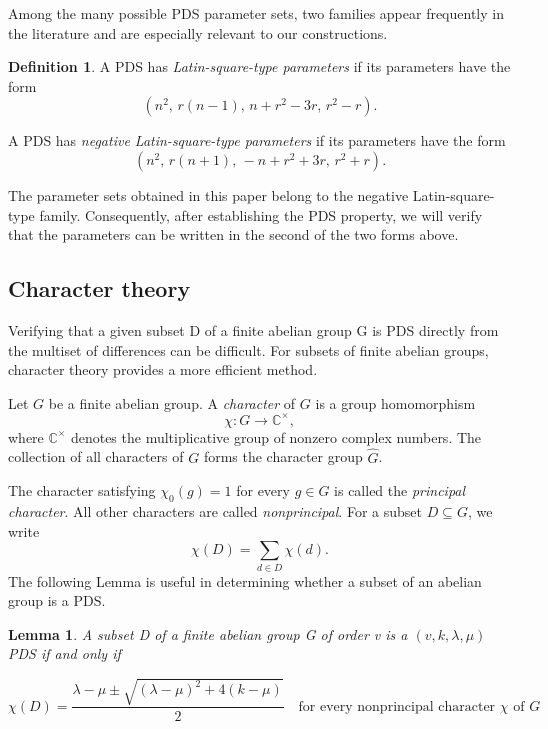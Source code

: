 \documentclass[11pt]{article}
\newtheorem{lemma}[theorem]{Lemma}
\theoremstyle{definition}
\newtheorem{definition}[theorem]{Definition}
\theoremstyle{remark}
\newcommand{\C}{\mathbb{C}}
\newcommand{\widehatG}{\widehat{G}}
\begin{document}
Among the many possible PDS parameter sets, two families appear
frequently in the literature and are especially relevant to our
constructions.

\begin{definition}
A PDS has \emph{Latin-square-type parameters} if
its parameters have the form
\[
\left(
n^2,\,
r(n-1),\,
n+r^2-3r,\,
r^2-r
\right).
\]

A PDS has
\emph{negative Latin-square-type parameters} if its parameters have
the form
\[
\left(
n^2,\,
r(n+1),\,
-n+r^2+3r,\,
r^2+r
\right).
\]
\end{definition}

The parameter sets obtained in this paper belong to the negative
Latin-square-type family. Consequently, after establishing the PDS
property, we will verify that the parameters can be written in the
second of the two forms above.


\subsection{Character theory}

Verifying that a given subset D of a finite abelian group G is PDS directly from the multiset of differences
can be difficult. For subsets of finite abelian groups, character
theory provides a more efficient method.

Let \(G\) be a finite abelian group. A \emph{character} of \(G\) is
a group homomorphism
\[
\chi:G\longrightarrow\C^\times,
\]
where \(\C^\times\) denotes the multiplicative group of nonzero
complex numbers. The collection of all characters of \(G\) forms the
character group \(\widehatG\).

The character satisfying $\chi_0(g)=1$ for every $g\in G$ is called the \emph{principal character}. All other characters are
called \emph{nonprincipal}. For a subset \(D\subseteq G\), we write
\[
\chi(D)=\sum_{d\in D}\chi(d).
\]
 The following Lemma is useful in determining whether a subset of an abelian group is a PDS. 


\begin{lemma}\label{lem:character} A subset D of a finite abelian group G of order v is a $(v, k, \lambda, \mu)$ PDS if and only if
    
\[
\chi(D) = \frac{\lambda - \mu \pm \sqrt{(\lambda - \mu)^2 + 4(k-\mu)}}{2} \quad \text{for every nonprincipal character } \chi \text{ of } G
\]
\end{lemma}
\end{document}
